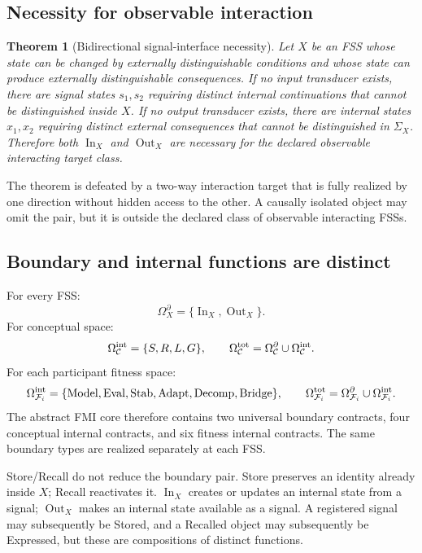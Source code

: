 \documentclass[11pt]{article}
\newtheorem{theorem}{Theorem}
\newcommand{\C}{\mathcal{C}}
\newcommand{\F}{\mathcal{F}}
\newcommand{\Model}{\operatorname{Model}}
\newcommand{\Eval}{\operatorname{Eval}}
\newcommand{\Stab}{\operatorname{Stab}}
\newcommand{\Adapt}{\operatorname{Adapt}}
\newcommand{\Decomp}{\operatorname{Decomp}}
\newcommand{\Bridge}{\operatorname{Bridge}}
\newcommand{\Sig}{\Sigma}
\newcommand{\InOp}{\operatorname{In}}
\newcommand{\OutOp}{\operatorname{Out}}
\begin{document}
\subsection{Necessity for observable interaction}

\begin{theorem}[Bidirectional signal-interface necessity]
Let $X$ be an FSS whose state can be changed by externally distinguishable conditions and whose state can produce externally distinguishable consequences. If no input transducer exists, there are signal states $s_1,s_2$ requiring distinct internal continuations that cannot be distinguished inside $X$. If no output transducer exists, there are internal states $x_1,x_2$ requiring distinct external consequences that cannot be distinguished in $\Sig_X$. Therefore both $\InOp_X$ and $\OutOp_X$ are necessary for the declared observable interacting target class.
\end{theorem}

The theorem is defeated by a two-way interaction target that is fully realized by one direction without hidden access to the other. A causally isolated object may omit the pair, but it is outside the declared class of observable interacting FSSs.

\subsection{Boundary and internal functions are distinct}

For every FSS:
\begin{equation}
\boxed{\Omega_X^{\partial}=\{\InOp_X,\OutOp_X\}.}
\end{equation}
For conceptual space:
\begin{equation}
\Omega_{\C}^{\rm int}=\{S,R,L,G\},\qquad
\Omega_{\C}^{\rm tot}=\Omega_{\C}^{\partial}\cup\Omega_{\C}^{\rm int}.
\end{equation}
For each participant fitness space:
\begin{equation}
\Omega_{\F_i}^{\rm int}=\{\Model,\Eval,\Stab,\Adapt,\Decomp,\Bridge\},\qquad
\Omega_{\F_i}^{\rm tot}=\Omega_{\F_i}^{\partial}\cup\Omega_{\F_i}^{\rm int}.
\end{equation}
The abstract FMI core therefore contains two universal boundary contracts, four conceptual internal contracts, and six fitness internal contracts. The same boundary types are realized separately at each FSS.

Store/Recall do not reduce the boundary pair. Store preserves an identity already inside $X$; Recall reactivates it. $\InOp_X$ creates or updates an internal state from a signal; $\OutOp_X$ makes an internal state available as a signal. A registered signal may subsequently be Stored, and a Recalled object may subsequently be Expressed, but these are compositions of distinct functions.
\end{document}
